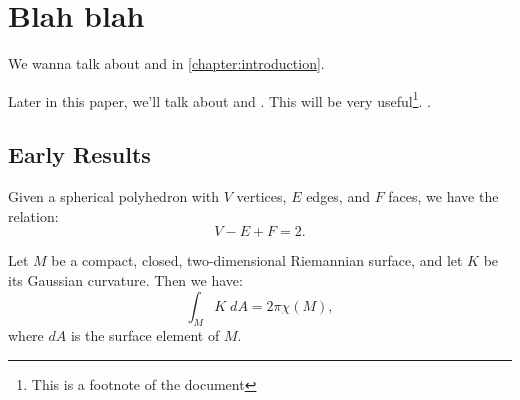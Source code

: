 \chapter{Blah blah}\label{chapter:blah}

%
%
We wanna talk about \cite{milnor1963groups} and \cite{milnor1956manifolds} in \autoref{chapter:introduction}. 

Later in this paper, we'll talk about \cite{milnor2000exotic} and \cite{dieck2008algebraic}. This will be very useful\footnote{This is a footnote of the document}. \cite{dieudonne2009history}.

\section{Early Results}

\begin{theorem}
	Given a spherical polyhedron with $V$ vertices, $E$ edges, and $F$ faces, we have the relation:
	\[
			V - E + F = 2.
	\]
\end{theorem}

\begin{theorem}
	Let $M$ be a compact, closed, two-dimensional Riemannian surface, and let $K$ be its Gaussian curvature. Then we have:
	\[
		\int_M K\; dA  = 2\pi \chi(M),
	\]
	where $dA$ is the surface element of $M$.
\end{theorem}

